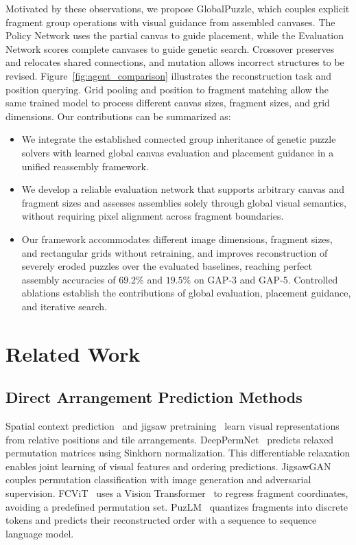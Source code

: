 \documentclass[10pt,twocolumn,letterpaper]{article}
\begin{document}
Motivated by these observations, we propose GlobalPuzzle, which couples explicit fragment group operations with visual guidance from assembled canvases. The Policy Network uses the partial canvas to guide placement, while the Evaluation Network scores complete canvases to guide genetic search. Crossover preserves and relocates shared connections, and mutation allows incorrect structures to be revised. Figure~\ref{fig:agent_comparison} illustrates the reconstruction task and position querying. Grid pooling and position to fragment matching allow the same trained model to process different canvas sizes, fragment sizes, and grid dimensions. Our contributions can be summarized as:
\begin{itemize}
    \item We integrate the established connected group inheritance of genetic puzzle solvers with learned global canvas evaluation and placement guidance in a unified reassembly framework.
    \item We develop a reliable evaluation network that supports arbitrary canvas and fragment sizes and assesses assemblies solely through global visual semantics, without requiring pixel alignment across fragment boundaries.
    \item Our framework accommodates different image dimensions, fragment sizes, and rectangular grids without retraining, and improves reconstruction of severely eroded puzzles over the evaluated baselines, reaching perfect assembly accuracies of $69.2\%$ and $19.5\%$ on GAP-3 and GAP-5. Controlled ablations establish the contributions of global evaluation, placement guidance, and iterative search.
\end{itemize}

\section{Related Work}

\subsection{Direct Arrangement Prediction Methods}

Spatial context prediction~\cite{doersch2015context} and jigsaw pretraining~\cite{noroozi2016jigsaw} learn visual representations from relative positions and tile arrangements. DeepPermNet~\cite{santacruz2017deeppermnet} predicts relaxed permutation matrices using Sinkhorn normalization. This differentiable relaxation enables joint learning of visual features and ordering predictions. JigsawGAN~\cite{li2022jigsawgan} couples permutation classification with image generation and adversarial supervision. FCViT~\cite{kim2025fcvit} uses a Vision Transformer~\cite{dosovitskiy2021vit} to regress fragment coordinates, avoiding a predefined permutation set. PuzLM~\cite{elkin2026puzlm} quantizes fragments into discrete tokens and predicts their reconstructed order with a sequence to sequence language model.
\end{document}
